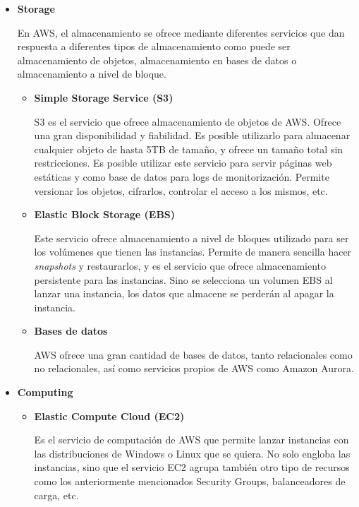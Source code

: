 \documentclass[../../memoria.tex]{subfiles}
\begin{document}
\begin{itemize}
      \item \textbf{Storage}
            \par
            En AWS, el almacenamiento se ofrece mediante diferentes servicios que dan respuesta a diferentes tipos de almacenamiento como puede ser almacenamiento de objetos, almacenamiento en bases de datos o almacenamiento a nivel de bloque.
            \begin{itemize}
                  \item \textbf{Simple Storage Service (S3)}
                        \par
                        S3 es el servicio que ofrece almacenamiento de objetos de AWS. Ofrece una gran disponibilidad y fiabilidad. Es posible utilizarlo para almacenar cualquier objeto de hasta 5TB de tamaño, y ofrece un tamaño total sin restricciones. Es posible utilizar este servicio para servir páginas web estáticas y como base de datos para logs de monitorización. Permite versionar los objetos, cifrarlos, controlar el acceso a los mismos, etc.
                  \item \textbf{Elastic Block Storage (EBS)}
                        \par
                        Este servicio ofrece almacenamiento a nivel de bloques utilizado para ser los volúmenes que tienen las instancias. Permite de manera sencilla hacer \textit{snapshots} y restaurarlos, y es el servicio que ofrece almacenamiento persistente para las instancias. Sino se selecciona un volumen EBS al lanzar una instancia, los datos que almacene se perderán al apagar la instancia.
                  \item \textbf{Bases de datos}
                        \par
                        AWS ofrece una gran cantidad de bases de datos, tanto relacionales como no relacionales, así como servicios propios de AWS como Amazon Aurora.
            \end{itemize}

      \item \textbf{Computing}
            \begin{itemize}
                  \item \textbf{Elastic Compute Cloud (EC2)}
                        \par
                        Es el servicio de computación de AWS que permite lanzar instancias con las distribuciones de Windows o Linux que se quiera. No solo engloba las instancias, sino que el servicio EC2 agrupa también otro tipo de recursos como los anteriormente mencionados Security Groups, balanceadores de carga, etc.
            \end{itemize}


\end{itemize}
\end{document}
